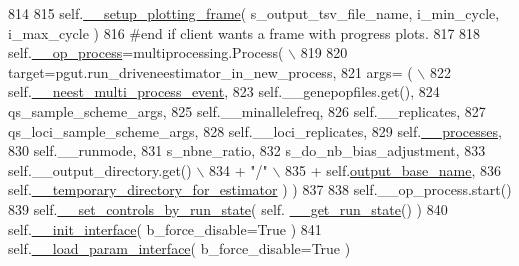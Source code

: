 \begin{DoxyCode}
814 
815             self.\hyperlink{classnegui_1_1pgguineestimator__experimental_1_1PGGuiNeEstimator_a016e227d075b40ab798238e71ccb735f}{\_\_setup\_plotting\_frame}( s\_output\_tsv\_file\_name, i\_min\_cycle, 
      i\_max\_cycle )
816         \textcolor{comment}{#end if client wants a frame with progress plots.}
817 
818         self.\hyperlink{classnegui_1_1pgguineestimator__experimental_1_1PGGuiNeEstimator_aaa2c18e3d44dde92b66cb9ebe54463b6}{\_\_op\_process}=multiprocessing.Process( \(\backslash\)
819 
820                 target=pgut.run\_driveneestimator\_in\_new\_process,
821                     args= ( \(\backslash\)
822                             self.\hyperlink{classnegui_1_1pgguineestimator__experimental_1_1PGGuiNeEstimator_ab0f0be0bc9d8f31b76a0e8e49cce6663}{\_\_neest\_multi\_process\_event},
823                             self.\_\_genepopfiles.get(),
824                             qs\_sample\_scheme\_args,
825                             self.\_\_minallelefreq,
826                             self.\_\_replicates,
827                             qs\_loci\_sample\_scheme\_args,
828                             self.\_\_loci\_replicates,
829                             self.\hyperlink{classnegui_1_1pgguineestimator__experimental_1_1PGGuiNeEstimator_aaf5cdaff0dd43af6e81c805611680fa6}{\_\_processes},
830                             self.\_\_runmode,
831                             s\_nbne\_ratio,
832                             s\_do\_nb\_bias\_adjustment,
833                             self.\_\_output\_directory.get() \(\backslash\)
834                                     + \textcolor{stringliteral}{"/"} \(\backslash\)
835                                     + self.\hyperlink{classnegui_1_1pgguineestimator__experimental_1_1PGGuiNeEstimator_aa99bb40c806d746401e2b59bbdc7d0a8}{output\_base\_name},
836                             self.\hyperlink{classnegui_1_1pgguineestimator__experimental_1_1PGGuiNeEstimator_a3a28a6a754afc8069d729f0d48e044bf}{\_\_temporary\_directory\_for\_estimator} ) )
837 
838         self.\_\_op\_process.start()
839         self.\hyperlink{classnegui_1_1pgguineestimator__experimental_1_1PGGuiNeEstimator_a4f894c66d178e1c34e805def6d7c4f30}{\_\_set\_controls\_by\_run\_state}( self.
      \hyperlink{classnegui_1_1pgguineestimator__experimental_1_1PGGuiNeEstimator_ae85f6ae9ee8842a94eae2d5025f328fc}{\_\_get\_run\_state}() )
840         self.\hyperlink{classnegui_1_1pgguineestimator__experimental_1_1PGGuiNeEstimator_a2b7e06e2b53c101c2d2363c922bce129}{\_\_init\_interface}( b\_force\_disable=\textcolor{keyword}{True} )
841         self.\hyperlink{classnegui_1_1pgguineestimator__experimental_1_1PGGuiNeEstimator_a837749bf5dc113fac16e84e09852a3b5}{\_\_load\_param\_interface}( b\_force\_disable=\textcolor{keyword}{True} )

\end{DoxyCode}
